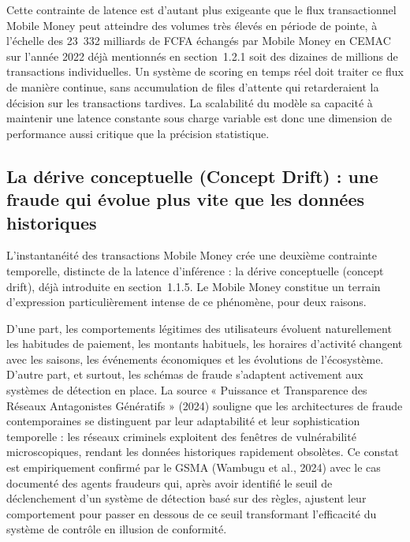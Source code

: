 \documentclass[11pt,a4paper,oneside]{report}
\theoremstyle{definition}
\theoremstyle{remark}
\begin{document}
Cette contrainte de latence est d'autant plus exigeante que le flux transactionnel Mobile Money peut atteindre des volumes très élevés en période de pointe, à l'échelle des 23~332 milliards de FCFA échangés par Mobile Money en CEMAC sur l'année 2022 déjà mentionnés en section~1.2.1  soit des dizaines de millions de transactions individuelles. Un système de scoring en temps réel doit traiter ce flux de manière continue, sans accumulation de files d'attente qui retarderaient la décision sur les transactions tardives. La scalabilité du modèle  sa capacité à maintenir une latence constante sous charge variable  est donc une dimension de performance aussi critique que la précision statistique.

\subsection{La dérive conceptuelle (Concept Drift) : une fraude qui évolue plus vite que les données historiques}

L'instantanéité des transactions Mobile Money crée une deuxième contrainte temporelle, distincte de la latence d'inférence : la dérive conceptuelle (concept drift), déjà introduite en section~1.1.5. Le Mobile Money constitue un terrain d'expression particulièrement intense de ce phénomène, pour deux raisons.

D'une part, les comportements légitimes des utilisateurs évoluent naturellement  les habitudes de paiement, les montants habituels, les horaires d'activité changent avec les saisons, les événements économiques et les évolutions de l'écosystème. D'autre part, et surtout, les schémas de fraude s'adaptent activement aux systèmes de détection en place. La source « Puissance et Transparence des Réseaux Antagonistes Génératifs » (2024) souligne que les architectures de fraude contemporaines se distinguent par leur adaptabilité et leur sophistication temporelle : les réseaux criminels exploitent des fenêtres de vulnérabilité microscopiques, rendant les données historiques rapidement obsolètes. Ce constat est empiriquement confirmé par le GSMA (Wambugu et al., 2024) avec le cas documenté des agents fraudeurs qui, après avoir identifié le seuil de déclenchement d'un système de détection basé sur des règles, ajustent leur comportement pour passer en dessous de ce seuil  transformant l'efficacité du système de contrôle en illusion de conformité.
\end{document}
